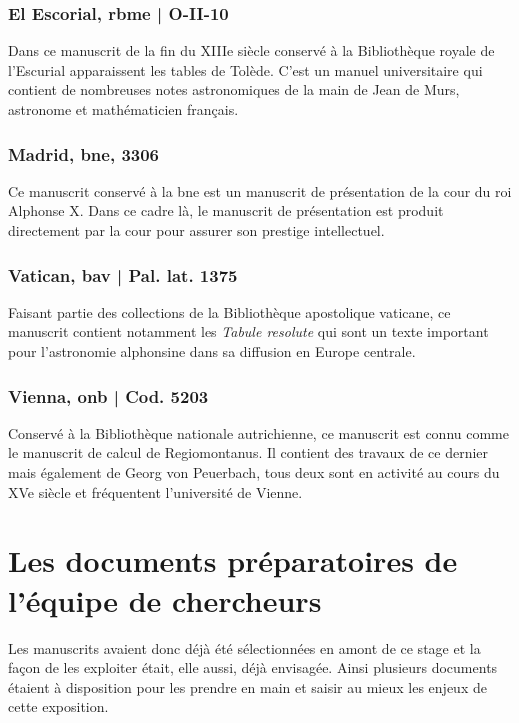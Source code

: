     \subsubsection{El Escorial, \acrshort{rbme} | O-II-10}
    Dans ce manuscrit de la fin du XIIIe siècle conservé à la Bibliothèque royale de l’Escurial apparaissent les tables de Tolède. C’est un manuel universitaire qui contient de nombreuses notes astronomiques de la main de Jean de Murs, astronome et mathématicien français.

    \subsubsection{Madrid, \acrshort{bne}, 3306}
    Ce manuscrit conservé à la \acrlong{bne} est un manuscrit de présentation de la cour du roi Alphonse X. Dans ce cadre là, le manuscrit de présentation est produit directement par la cour pour assurer son prestige intellectuel. 

    \subsubsection{Vatican, \acrshort{bav} | Pal. lat. 1375}
    Faisant partie des collections de la Bibliothèque apostolique vaticane, ce manuscrit contient notamment les \textit{Tabule resolute} qui sont un texte important pour l’astronomie alphonsine dans sa diffusion en Europe centrale.

    \subsubsection{Vienna, \acrshort{onb} | Cod. 5203}
    Conservé à la Bibliothèque nationale autrichienne, ce manuscrit est connu comme le manuscrit de calcul de Regiomontanus. Il contient des travaux de ce dernier mais également de Georg von Peuerbach, tous deux sont en activité au cours du XVe siècle et fréquentent l’université de Vienne. 

	\section{Les documents préparatoires de l’équipe de chercheurs}
	Les manuscrits avaient donc déjà été sélectionnées en amont de ce stage et la façon de les exploiter était, elle aussi, déjà envisagée. Ainsi plusieurs documents étaient à disposition pour les prendre en main et saisir au mieux les enjeux de cette exposition. 
